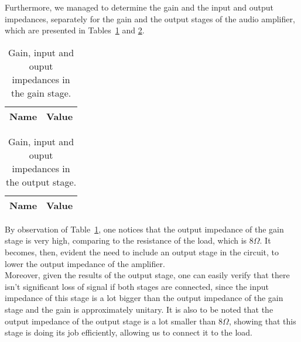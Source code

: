 Furthermore, we managed to determine the gain and the input and output impedances, separately for the gain and the output stages of the audio amplifier, which are presented in Tables~\ref{tab:gaindata} and \ref{tab:outputdata}.

\vspace{3mm}

\noindent
\begin{minipage}[c]{0.5\linewidth}

\begin{table}[H]
  \centering
  \begin{tabular}{|l|r|}
    \hline    
    {\bf Name} & {\bf Value} \\ \hline
    
  \end{tabular}
  \caption{Gain, input and ouput impedances in the gain stage.}
  \label{tab:gaindata}
\end{table}

\end{minipage}
\begin{minipage}[c]{0.5\linewidth}

\begin{table}[H]
  \centering
  \begin{tabular}{|l|r|}
    \hline    
    {\bf Name} & {\bf Value} \\ \hline
    
  \end{tabular}
  \caption{Gain, input and ouput impedances in the output stage.}
  \label{tab:outputdata}
\end{table}

\end{minipage}

\vspace{8mm}

By observation of Table~\ref{tab:gaindata}, one notices that the output impedance of the gain stage is very high, comparing to the resistance of the load, which is $8\Omega$. It becomes, then, evident the need to include an output stage in the circuit, to lower the output impedance of the amplifier.\\

Moreover, given the results of the output stage, one can easily verify that there isn't significant loss of signal if both stages are connected, since the input impedance of this stage is a lot bigger than the output impedance of the gain stage and the gain is approximately unitary. It is also to be noted that the output impedance of the output stage is a lot smaller than $8\Omega$, showing that this stage is doing its job efficiently, allowing us to connect it to the load. \\

